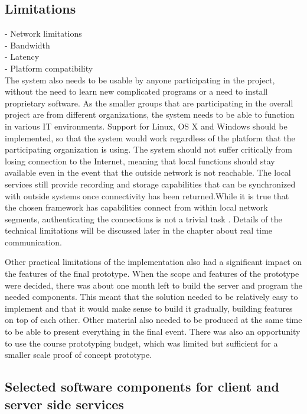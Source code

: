 \documentclass[english,12pt,a4paper,dvips]{article}
\begin{document}
\subsection{Limitations}

- Network limitations\\
- Bandwidth\\
- Latency\\
- Platform compatibility\\

The system also needs to be usable by anyone participating in the project, without the need to learn new complicated programs or a need to install proprietary software. As the smaller groups that are participating in the overall project are from different organizations, the system needs to be able to function in various IT environments. Support for Linux, OS X and Windows should be implemented, so that the system would work regardless of the platform that the participating organization is using. The system should not suffer critically from losing connection to the Internet, meaning that local functions should stay available even in the event that the outside network is not reachable. The local services still provide recording and storage capabilities that can be synchronized with outside systems once connectivity has been returned.While it is true that the chosen framework has capabilities connect from within local network segments, authenticating the connections is not a trivial task \cite{Johnston}. Details of the technical limitations will be discussed later in the chapter about real time communication.

Other practical limitations of the implementation also had a significant impact on the features of the final prototype. When the scope and features of the prototype were decided, there was about one month left to build the server and program the needed components. This meant that the solution needed to be relatively easy to implement and that it would make sense to build it gradually, building features on top of each other. Other material also needed to be produced at the same time to be able to present everything in the final event. There was also an opportunity to use the course prototyping budget, which was limited but sufficient for a smaller scale proof of concept prototype.

\subsection{Selected software components for client and server side services}
\end{document}
